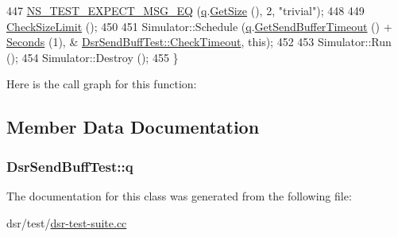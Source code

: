 \begin{DoxyCode}
447   \hyperlink{group__testing_ga7304ba46a28d8cf08dfdfd6499cf7068}{NS\_TEST\_EXPECT\_MSG\_EQ} (\hyperlink{classDsrSendBuffTest_a83f4a850e85cfbe57261e4785340411a}{q}.\hyperlink{classns3_1_1dsr_1_1DsrSendBuffer_a0ecf75786eef7193fa5a5d84b2b7a1f0}{GetSize} (), 2, \textcolor{stringliteral}{"trivial"});
448 
449   \hyperlink{classDsrSendBuffTest_a1098fcaace1182d29902ec5b921a1022}{CheckSizeLimit} ();
450 
451   Simulator::Schedule (\hyperlink{classDsrSendBuffTest_a83f4a850e85cfbe57261e4785340411a}{q}.\hyperlink{classns3_1_1dsr_1_1DsrSendBuffer_a72dfd7d7334d0f6ca0064ce807f9a938}{GetSendBufferTimeout} () + \hyperlink{group__timecivil_ga33c34b816f8ff6628e33d5c8e9713b9e}{Seconds} (1), &
      \hyperlink{classDsrSendBuffTest_a7ee9e5c91ebe653dc7f4783ae92ccd99}{DsrSendBuffTest::CheckTimeout}, \textcolor{keyword}{this});
452 
453   Simulator::Run ();
454   Simulator::Destroy ();
455 \}
\end{DoxyCode}


Here is the call graph for this function\+:




\subsection{Member Data Documentation}
\subsubsection[{\texorpdfstring{q}{q}}]{ Dsr\+Send\+Buff\+Test\+::q}\hypertarget{classDsrSendBuffTest_a83f4a850e85cfbe57261e4785340411a}{}\label{classDsrSendBuffTest_a83f4a850e85cfbe57261e4785340411a}


The documentation for this class was generated from the following file\+:\begin{DoxyCompactItemize}
\item 
dsr/test/\hyperlink{dsr-test-suite_8cc}{dsr-\/test-\/suite.\+cc}\end{DoxyCompactItemize}
